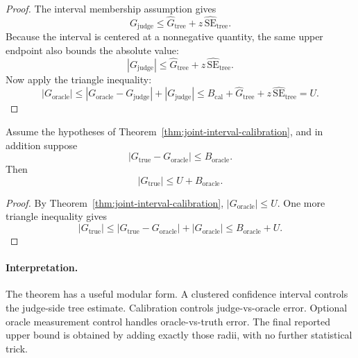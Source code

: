 \begin{proof}
The interval membership assumption gives
\[
G_{\mathrm{judge}}
\le
\widehat G_{\mathrm{tree}} + z\,\widehat{\mathrm{SE}}_{\mathrm{tree}}.
\]
Because the interval is centered at a nonnegative quantity, the same upper
endpoint also bounds the absolute value:
\[
|G_{\mathrm{judge}}|
\le
\widehat G_{\mathrm{tree}} + z\,\widehat{\mathrm{SE}}_{\mathrm{tree}}.
\]
Now apply the triangle inequality:
\[
|G_{\mathrm{oracle}}|
\le
|G_{\mathrm{oracle}}-G_{\mathrm{judge}}| + |G_{\mathrm{judge}}|
\le
B_{\mathrm{cal}}
 + \widehat G_{\mathrm{tree}}
 + z\,\widehat{\mathrm{SE}}_{\mathrm{tree}}
= U.
\]
\end{proof}

\begin{theorem}
\label{thm:joint-interval-calibration-oracle}
Assume the hypotheses of
Theorem~\ref{thm:joint-interval-calibration}, and in addition suppose
\[
|G_{\mathrm{true}} - G_{\mathrm{oracle}}| \le B_{\mathrm{oracle}}.
\]
Then
\[
|G_{\mathrm{true}}| \le U + B_{\mathrm{oracle}}.
\]
\end{theorem}

\begin{proof}
By Theorem~\ref{thm:joint-interval-calibration},
$|G_{\mathrm{oracle}}| \le U$. One more triangle inequality gives
\[
|G_{\mathrm{true}}|
\le
|G_{\mathrm{true}}-G_{\mathrm{oracle}}| + |G_{\mathrm{oracle}}|
\le
B_{\mathrm{oracle}} + U.
\]
\end{proof}

\paragraph{Interpretation.}
The theorem has a useful modular form. A clustered confidence interval controls
the judge-side tree estimate. Calibration controls judge-vs-oracle error.
Optional oracle measurement control handles oracle-vs-truth error. The final
reported upper bound is obtained by adding exactly those radii, with no further
statistical trick.
